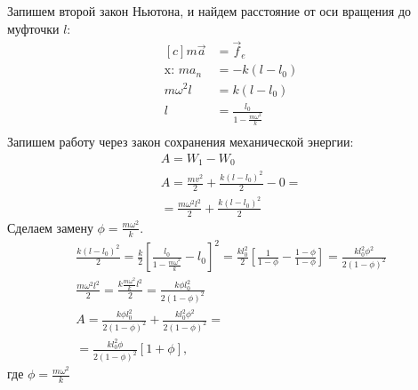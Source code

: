 \documentclass[a5paper,10pt]{article}
\begin{document}
\begin{figure}[H]
\vspace{-1em}
\end{figure}
Запишем второй закон Ньютона, и найдем расстояние от оси вращения до муфточки $l$: 
\begin{equation*}
	\begin{aligned}[c]
        m\vec{a}&=\vec{f}_e\\
        \text{x: } ma_n&=-k(l-l_0)\\
        m\omega^2l&=k(l-l_0)\\
        l&=\frac{l_0}{1-\frac{m\omega^2}{k}}\\
	\end{aligned}
\end{equation*}
Запишем работу через закон сохранения механической энергии:
\begin{gather*}
        A=W_1-W_0\\
        A=\frac{mv^2}{2}+\frac{k(l-l_0)^2}{2}-0=\\
        =\frac{m\omega^2l^2}{2}+\frac{k(l-l_0)^2}{2}
\end{gather*}
Сделаем замену $\phi=\frac{m\omega^2}{k}$.
\begin{gather*}
\frac{k(l-l_0)^2}{2}=\frac{k}{2}\left[
    \frac{l_0}{1-\frac{m\omega^2}{k}}-l_0
\right]^2=\frac{kl_0^2}{2}\left[\frac{1}{1-\phi}-\frac{1-\phi}{1-\phi}\right]=\frac{kl_0^2\phi^2}{2({1-\phi})^2}\\
\frac{m\omega^2l^2}{2}=\frac{k\frac{m\omega^2}{k}l^2}{2}=
\frac{k\phi l_0^2}{2(1-\phi)^2}\\
    A=\frac{k\phi{}l_0^2}{2(1-\phi)^2}+
    \frac{kl_0^2\phi^2}{2(1-\phi)^2}=\\
    =\frac{kl_0^2\phi}{2(1-\phi)^2}\left[1+\phi\right],
\end{gather*}
где $\phi=\frac{m\omega^2}{k}$
\end{document}
